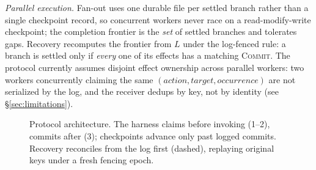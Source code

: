\documentclass[10pt,journal,compsoc]{IEEEtran}
\begin{document}
\emph{Parallel execution.} Fan-out uses one durable file per settled branch
rather than a single checkpoint record, so concurrent workers never race on
a read-modify-write checkpoint; the completion frontier is the \emph{set} of
settled branches and tolerates gaps. Recovery recomputes the frontier from
$L$ under the log-fenced rule: a branch is settled only if \emph{every} one
of its effects has a matching \textsc{Commit}. The protocol currently
assumes disjoint effect ownership across parallel workers: two workers
concurrently claiming the same $(\mathit{action}, \mathit{target},
\mathit{occurrence})$ are not serialized by the log, and the receiver dedups by key, not by identity
(see \S\ref{sec:limitations}).

\begin{figure}[ht]
\centering
{}
\caption{Protocol architecture. The harness claims before
invoking (1--2), commits after (3); checkpoints advance only
past logged commits. Recovery reconciles from the log first
(dashed), replaying original keys under a fresh fencing epoch.}
\label{fig:arch}
\end{figure}
\end{document}

